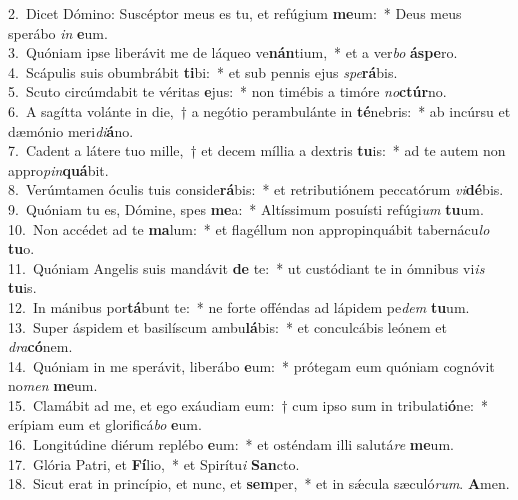 {2.~}Dicet Dómino: Suscéptor meus es tu, et refúgium \textbf{me}um:~* Deus meus sperábo \textit{in} \textbf{e}um.\\
{3.~}Quóniam ipse liberávit me de láqueo ve\textbf{nán}tium,~* et a ver\textit{bo} \textbf{á}\textbf{spe}ro.\\
{4.~}Scápulis suis obumbrábit \textbf{ti}bi:~* et sub pennis ejus \textit{spe}\textbf{rá}bis.\\
{5.~}Scuto circúmdabit te véritas \textbf{e}jus:~* non timébis a timóre \textit{no}\textbf{ctúr}no.\\
{6.~}A sagítta volánte in die,~† a negótio perambulánte in \textbf{té}nebris:~* ab incúrsu et dæmónio meri\textit{di}\textbf{á}no.\\
{7.~}Cadent a látere tuo mille,~† et decem míllia a dextris \textbf{tu}is:~* ad te autem non appro\textit{pin}\textbf{quá}bit.\\
{8.~}Verúmtamen óculis tuis conside\textbf{rá}bis:~* et retributiónem peccatórum \textit{vi}\textbf{dé}bis.\\
{9.~}Quóniam tu es, Dómine, spes \textbf{me}a:~* Altíssimum posuísti refúgi\textit{um} \textbf{tu}um.\\
{10.~}Non accédet ad te \textbf{ma}lum:~* et flagéllum non appropinquábit tabernácu\textit{lo} \textbf{tu}o.\\
{11.~}Quóniam Angelis suis mandávit \textbf{de} te:~* ut custódiant te in ómnibus vi\textit{is} \textbf{tu}is.\\
{12.~}In mánibus por\textbf{tá}bunt te:~* ne forte offéndas ad lápidem pe\textit{dem} \textbf{tu}um.\\
{13.~}Super áspidem et basilíscum ambu\textbf{lá}bis:~* et conculcábis leónem et \textit{dra}\textbf{có}nem.\\
{14.~}Quóniam in me sperávit, liberábo \textbf{e}um:~* prótegam eum quóniam cognóvit no\textit{men} \textbf{me}um.\\
{15.~}Clamábit ad me, et ego exáudiam eum:~† cum ipso sum in tribulati\textbf{ó}ne:~* erípiam eum et glorificá\textit{bo} \textbf{e}um.\\
{16.~}Longitúdine diérum replébo \textbf{e}um:~* et osténdam illi salutá\textit{re} \textbf{me}um.\\
{17.~}Glória Patri, et \textbf{Fí}lio,~* et Spirítu\textit{i} \textbf{San}cto.\\
{18.~}Sicut erat in princípio, et nunc, et \textbf{sem}per,~* et in sǽcula sæculó\textit{rum}. \textbf{A}men.\\
